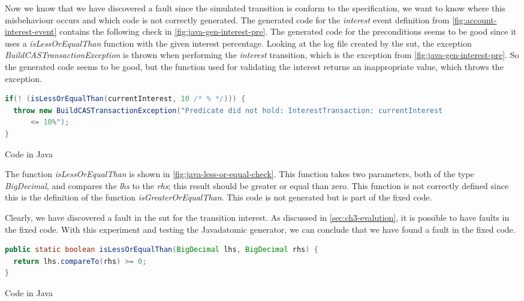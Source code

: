Now we know that we have discovered a fault since the simulated transition is
conform to the specification, we want to know where this misbehaviour occurs and
which code is not correctly generated. The generated code for the \textit{interest} event
definition from \autoref{fig:account-interest-event} contains the following
check in \autoref{fig:java-gen-interest-pre}. The generated code for the
preconditions seems to be good since it uses a \textit{isLessOrEqualThan}
function with the given interest percentage. Looking at the log file created by
the \gls{sut}, the exception \textit{BuildCASTransactionException} is thrown when
performing the \textit{interest} transition, which is the exception from
\autoref{fig:java-gen-interest-pre}. So the generated code seems to be good, but
the function used for validating the interest returns an inappropriate value,
which throws the exception.

\begin{sourcecode}[h!]
\begin{lstlisting}[language=Java]
if(! (isLessOrEqualThan(currentInterest, 10 /* % */))) {
  throw new BuildCASTransactionException("Predicate did not hold: InterestTransaction: currentInterest
	  <= 10%");
}
\end{lstlisting}
\caption{Code in Java}\label{fig:java-gen-interest-pre}
\end{sourcecode}
\FloatBarrier

The function \textit{isLessOrEqualThan} is shown in
\autoref{fig:java-less-or-equal-check}. This function takes two parameters, both
of the type \textit{BigDecimal}, and compares the \textit{lhs} to the
\textit{rhs}; this result should be greater or equal than zero. This function
is not correctly defined since this is the definition of the function
\textit{isGreaterOrEqualThan}. This code is not generated but is part of the
fixed code.

Clearly, we have discovered a fault in the \gls{sut} for the transition
interest. As discussed in \autoref{sec:ch3-evalution}, it is possible to have
faults in the fixed code. With this experiment and testing the Javadatomic
generator, we can conclude that we have found a fault in the fixed code.

\begin{sourcecode}[h!]
\begin{lstlisting}[language=Java]
public static boolean isLessOrEqualThan(BigDecimal lhs, BigDecimal rhs) {
  return lhs.compareTo(rhs) >= 0;
}
\end{lstlisting}
\caption{Code in Java}\label{fig:java-less-or-equal-check}
\end{sourcecode}
\FloatBarrier

